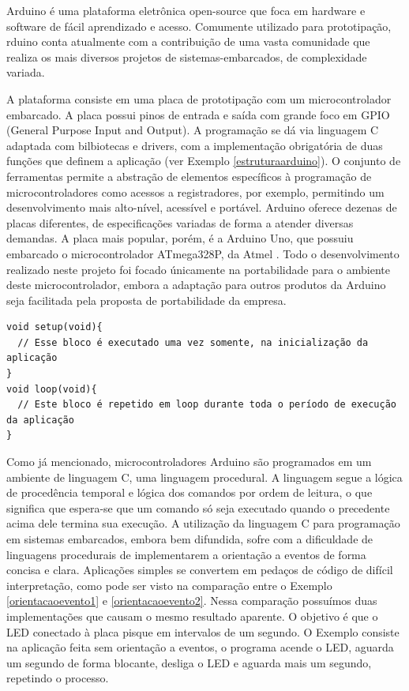 \documentclass{article}
\begin{document}
\tab Arduino é uma plataforma eletrônica open-source que foca em hardware e software de fácil aprendizado e acesso. Comumente utilizado para prototipação, rduino conta atualmente com a contribuição de uma vasta comunidade que realiza os mais diversos projetos de sistemas-embarcados, de complexidade variada. \cite{arduinoblog}
\par A plataforma consiste em uma placa de prototipação com um microcontrolador embarcado. A placa possui pinos de entrada e saída com grande foco em GPIO (General Purpose Input and Output). A programação se dá via linguagem C adaptada com bilbiotecas e drivers, com a implementação obrigatória de duas funções que definem a aplicação (ver Exemplo \ref{estruturaarduino}). O conjunto de ferramentas permite a abstração de elementos específicos à programação de microcontroladores como acessos a registradores, por exemplo, permitindo um desenvolvimento mais alto-nível, acessível e portável. Arduino oferece dezenas de placas diferentes, de especificações variadas de forma a atender diversas demandas. A placa mais popular, porém, é a Arduino Uno, que possuiu embarcado o microcontrolador ATmega328P, da Atmel \cite{atmegadatasheet}. Todo o desenvolvimento realizado neste projeto foi focado únicamente na portabilidade para o ambiente deste microcontrolador, embora a adaptação para outros produtos da Arduino seja facilitada pela proposta de portabilidade da empresa.
\begin{lstlisting}[style=CStyle,label=estruturaarduino,caption=Estrutura de uma aplicação Arduino]
void setup(void){
  // Esse bloco é executado uma vez somente, na inicialização da aplicação
}
void loop(void){
  // Este bloco é repetido em loop durante toda o período de execução da aplicação
}
\end{lstlisting}
\par Como já mencionado, microcontroladores Arduino são programados em um ambiente de linguagem C, uma linguagem procedural. A linguagem segue a lógica de procedência temporal e lógica dos comandos por ordem de leitura, o que significa que espera-se que um comando só seja executado quando o precedente acima dele termina sua execução. A utilização da linguagem C para programação em sistemas embarcados, embora bem difundida, sofre com a dificuldade de linguagens procedurais de implementarem a orientação a eventos de forma concisa e clara. Aplicações simples se convertem em pedaços de código de difícil interpretação, como pode ser visto na comparação entre o Exemplo \ref{orientacaoevento1} e \ref{orientacaoevento2}. Nessa comparação possuímos duas implementações que causam o mesmo resultado aparente. O objetivo é que o LED conectado à placa pisque em intervalos de um segundo. O Exemplo \cite{orientacaoevento1} consiste na aplicação feita sem orientação a eventos, o programa acende o LED, aguarda um segundo de forma blocante, desliga o LED e aguarda mais um segundo, repetindo o processo.
\end{document}
